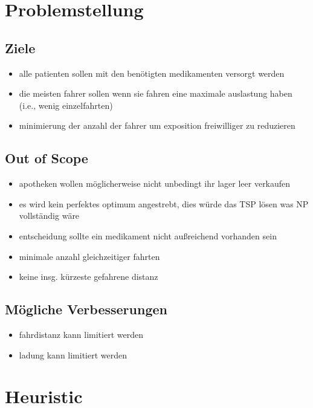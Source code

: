 \documentclass[a4]{article}
\begin{document}
\section{Problemstellung}

\subsection{Ziele}

\begin{itemize}
\item alle patienten sollen mit den benötigten medikamenten versorgt werden
\item die meisten fahrer sollen wenn sie fahren eine maximale auslastung haben (i.e., wenig einzelfahrten)
\item minimierung der anzahl der fahrer um exposition freiwilliger zu reduzieren
\end{itemize}

\subsection{Out of Scope}

\begin{itemize}
\item apotheken wollen möglicherweise nicht unbedingt ihr lager leer verkaufen
\item es wird kein perfektes optimum angestrebt, dies würde das TSP lösen was NP vollständig wäre
\item entscheidung sollte ein medikament nicht außreichend vorhanden sein
\item minimale anzahl gleichzeitiger fahrten
\item keine insg. kürzeste gefahrene distanz
\end{itemize}

\subsection{Mögliche Verbesserungen}

\begin{itemize}
\item fahrdistanz kann limitiert werden
\item ladung kann limitiert werden
\end{itemize}

\section{Heuristic}
\end{document}
